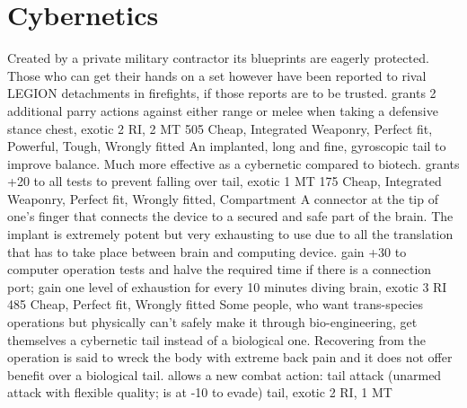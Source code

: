 \documentclass[12pt,a4paper,openany,usenames,dvipsnames]{book}
\begin{document}
    \section{Cybernetics}
        {Created by a private military contractor its blueprints are eagerly protected. Those who can get their hands on a set however have been reported to rival LEGION detachments in firefights, if those reports are to be trusted.}
        {grants 2 additional parry actions against either range or melee when taking a defensive stance}
        {chest, exotic}
        {2 RI, 2 MT}
        {505}
        {Cheap, Integrated Weaponry, Perfect fit, Powerful, Tough, Wrongly fitted}
        {An implanted, long and fine, gyroscopic tail to improve balance. Much more effective as a cybernetic compared to biotech.}
        {grants +20 to all tests to prevent falling over}
        {tail, exotic}
        {1 MT}
        {175}
        {Cheap, Integrated Weaponry, Perfect fit, Wrongly fitted, Compartment}
        {A connector at the tip of one's finger that connects the device to a secured and safe part of the brain. The implant is extremely potent but very exhausting to use due to all the translation that has to take place between brain and computing device.}
        {gain +30 to computer operation tests and halve the required time if there is a connection port; gain one level of exhaustion for every 10 minutes diving}
        {brain, exotic}
        {3 RI}
        {485}
        {Cheap, Perfect fit, Wrongly fitted}
        {Some people, who want trans-species operations but physically can't safely make it through bio-engineering, get themselves a cybernetic tail instead of a biological one. Recovering from the operation is said to wreck the body with extreme back pain and it does not offer benefit over a biological tail.}
        {allows a new combat action: tail attack (unarmed attack with flexible quality; is at -10 to evade)}
        {tail, exotic}
        {2 RI, 1 MT}
\end{document}
